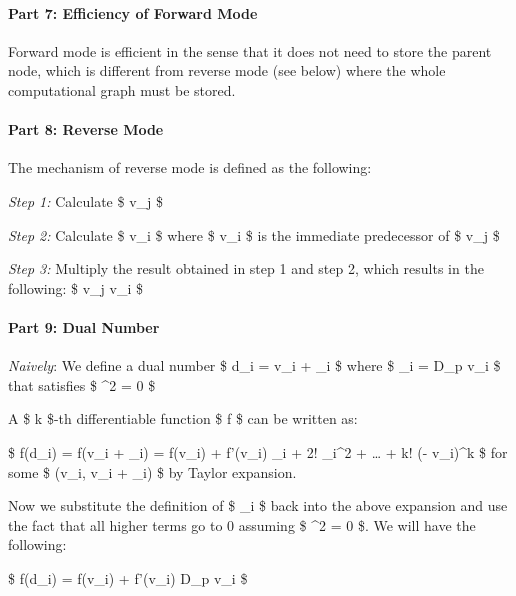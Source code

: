 \documentclass[11pt]{article}
\begin{document}
\hypertarget{part-7-efficiency-of-forward-mode}{%
\paragraph{Part 7: Efficiency of Forward
Mode}\label{part-7-efficiency-of-forward-mode}}

Forward mode is efficient in the sense that it does not need to store
the parent node, which is different from reverse mode (see below) where
the whole computational graph must be stored.

\hypertarget{part-8-reverse-mode}{%
\paragraph{Part 8: Reverse Mode}\label{part-8-reverse-mode}}

The mechanism of reverse mode is defined as the following:

\emph{Step 1:} Calculate \$  {\partial v_j} \$

\emph{Step 2:} Calculate \$  {\partial v_i} \$
where \$ v\_i \$ is the immediate predecessor of \$ v\_j \$

\emph{Step 3:} Multiply the result obtained in step 1 and step 2, which
results in the following: \$  {\partial v_j}
 {\partial v_i} \$

\hypertarget{part-9-dual-number}{%
\paragraph{Part 9: Dual Number}\label{part-9-dual-number}}

\emph{Naively}: We define a dual number \$ d\_i = v\_i + \delta\_i \$
where \$ \delta\_i = D\_p v\_i \epsilon \$ that satisfies \$
\epsilon\^{}2 = 0 \$

A \$ k \$-th differentiable function \$ f \$ can be written as:

\$ f(d\_i) = f(v\_i + \delta\_i) = f(v\_i) + f'(v\_i) \delta\_i +
 {2!} \delta\_i\^{}2 + \ldots{} +
 {k!} (\zeta - v\_i)\^{}k \$ for some \$
\zeta \in (v\_i, v\_i + \delta\_i) \$ by Taylor expansion.

Now we substitute the definition of \$ \delta\_i \$ back into the above
expansion and use the fact that all higher terms go to 0 assuming \$
\epsilon\^{}2 = 0 \$. We will have the following:

\$ f(d\_i) = f(v\_i) + f'(v\_i) D\_p v\_i \epsilon \$
\end{document}
